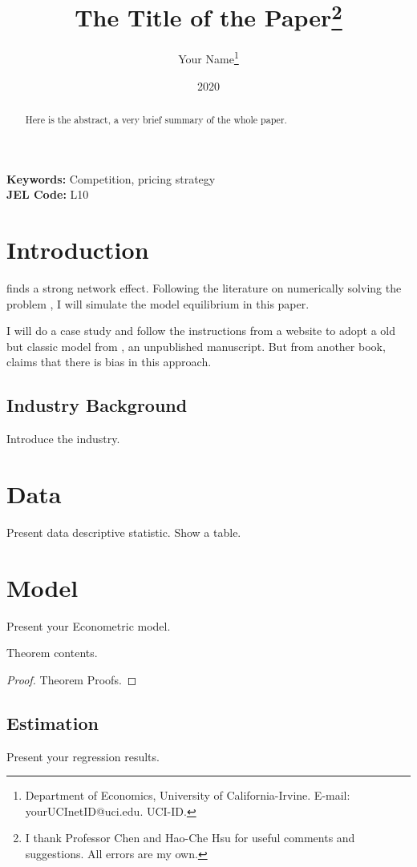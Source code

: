 \documentclass[12pt, letterpaper, oneside]{article}
\title{The Title of the Paper\thanks{I thank Professor Chen and Hao-Che Hsu for useful comments and suggestions. All errors are my own.}}
\author{Your Name\footnote{Department of Economics, University of California-Irvine. E-mail: yourUCInetID@uci.edu. UCI-ID.}}
\date{2020}
\begin{document}
\doublespacing

\maketitle

\begin{abstract}
    Here is the abstract, a very brief summary of the whole paper. %
\end{abstract}

\noindent\textbf{Keywords:} Competition, pricing strategy\\

\noindent\textbf{JEL Code:} L10
\newpage

\section{Introduction}
\cite{chen2018} finds a strong network effect. Following the literature on numerically solving the problem \citep{chen2018}, I will simulate the model equilibrium in this paper.

I will do a case study and follow the instructions from a website \citep{web-io} to adopt a old but classic model from \cite{art}, an unpublished manuscript. But from another book, \cite{book-tirole} claims that there is bias in this approach.

\subsection{Industry Background}
Introduce the industry.

\section{Data}
Present data descriptive statistic. Show a table.

\section{Model}
Present your Econometric model.

\begin{theorem}
    Theorem contents.
\end{theorem}
\begin{proof}
    Theorem Proofs.
\end{proof}

\subsection{Estimation}
Present your regression results.
\end{document}
